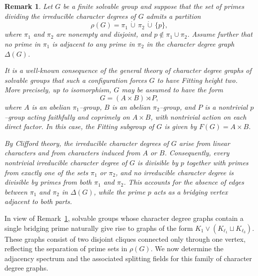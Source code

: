 \documentclass[11pt]{amsart}
\newtheorem{rem}[thm]{\bf Remark}
\begin{document}
\begin{rem}{\cite{Lewis2001}}\label{rem:general-structure-bridge}
Let $G$ be a finite solvable group and suppose that the set of primes dividing the irreducible character degrees of $G$ admits a partition
\[
\rho(G)=\pi_1 \,\dot\cup\, \pi_2 \,\dot\cup\, \{p\},
\]
where $\pi_1$ and $\pi_2$ are nonempty and disjoint, and $p\notin \pi_1\cup\pi_2$. Assume further that no prime in $\pi_1$ is adjacent to any prime in $\pi_2$ in the character degree graph $\Delta(G)$.

It is a well-known consequence of the general theory of character degree graphs of solvable groups that such a configuration forces $G$ to have Fitting height two. More precisely, up to isomorphism, $G$ may be assumed to have the form
\[
G=(A\times B)\rtimes P,
\]
where $A$ is an abelian $\pi_1$--group, $B$ is an abelian $\pi_2$--group, and $P$ is a nontrivial $p$--group acting faithfully and coprimely on $A\times B$, with nontrivial action on each direct factor. In this case, the Fitting subgroup of $G$ is given by $F(G)=A\times B$.

By Clifford theory, the irreducible character degrees of $G$ arise from linear characters and from characters induced from $A$ or $B$. Consequently, every nontrivial irreducible character degree of $G$ is divisible by $p$ together with primes from exactly one of the sets $\pi_1$ or $\pi_2$, and no irreducible character degree is divisible by primes from both $\pi_1$ and $\pi_2$. This accounts for the absence of edges between $\pi_1$ and $\pi_2$ in $\Delta(G)$, while the prime $p$ acts as a bridging vertex adjacent to both parts.
\end{rem}

In view of Remark~\ref{rem:general-structure-bridge}, solvable groups whose character degree graphs contain a single bridging prime naturally give rise to graphs of the form $K_1 \vee (K_{\ell_1}\sqcup K_{\ell_3})$. These graphs consist of two disjoint cliques connected only through one vertex, reflecting the separation of prime sets in $\rho(G)$. We now determine the adjacency spectrum and the associated splitting fields for this family of character degree graphs.
\end{document}
